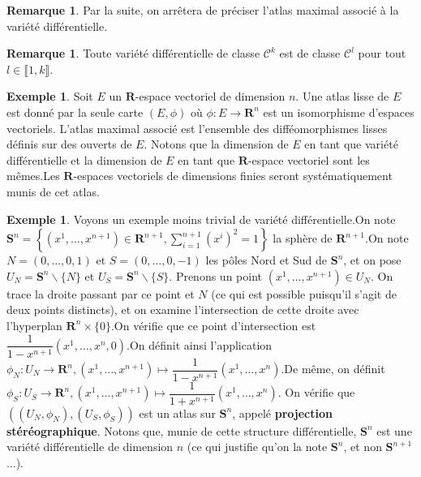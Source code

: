 \documentclass[12pt,a4paper]{article}
\theoremstyle{definition}
\newtheorem{ex}[thm]{Exemple}
\newtheorem{rqe}[thm]{Remarque}
\begin{document}
\begin{rqe}
Par la suite, on arrêtera de préciser l'atlas maximal associé à la variété différentielle.
\end{rqe}
\begin{rqe}
Toute variété différentielle de classe $\mathcal{C}^k$ est de classe $\mathcal{C}^{l}$ pour tout $l\in\llbracket 1,k\rrbracket$.
\end{rqe}
\begin{ex}
Soit $E$ un $\mathbf{R}$-espace vectoriel de dimension $n$. Une atlas lisse de $E$ est donné par la seule carte $(E,\phi)$ où $\phi:E\to\mathbf{R}^n$ est un isomorphisme d'espaces vectoriels. L'atlas maximal associé est l'ensemble des difféomorphismes lisses définis sur des ouverts de $E$. Notons que la dimension de $E$ en tant que variété différentielle et la dimension de $E$ en tant que $\mathbf{R}$-espace vectoriel sont les mêmes.\newline Les $\mathbf{R}$-espaces vectoriels de dimensions finies seront systématiquement munis de cet atlas.
\end{ex}
\begin{ex}
Voyons un exemple moins trivial de variété différentielle.\newline On note $\displaystyle\mathbf{S}^n=\left\lbrace(x^1,\ldots,x^{n+1})\in\mathbf{R}^{n+1},\sum\limits_{i=1}^{n+1}(x^i)^2=1\right\rbrace$ la sphère de $\mathbf{R}^{n+1}$.\newline On note $N=(0,\ldots, 0,1)$ et $S=(0,\ldots, 0,-1)$ les pôles Nord et Sud de $\mathbf{S}^n$, et on pose $U_N=\mathbf{S}^n\backslash \{N\}$ et $U_S=\mathbf{S}^n\backslash\{S\}$. Prenons un point $(x^1,\ldots,x^{n+1})\in U_N$. On trace la droite passant par ce point et $N$ (ce qui est possible puisqu'il s'agit de deux points distincts), et on examine l'intersection de cette droite avec l'hyperplan $\mathbf{R}^n\times\{0\}$.\newline On vérifie que ce point d'intersection est $\dfrac{1}{1-x^{n+1}}(x^1,\ldots,x^n,0)$.\newline On définit ainsi l'application $\phi_N: U_N\to\mathbf{R}^n, (x^1,\ldots,x^{n+1})\mapsto\dfrac{1}{1-x^{n+1}}(x^1,\ldots,x^n)$.\newline De même, on définit $\phi_S: U_S\to\mathbf{R}^n, (x^1,\ldots,x^{n+1})\mapsto\dfrac{1}{1+x^{n+1}}(x^1,\ldots,x^n)$. On vérifie que $((U_N,\phi_N),(U_S,\phi_S))$ est un atlas sur $\mathbf{S}^n$, appelé \textbf{projection stéréographique}.\newline
Notons que, munie de cette structure différentielle, $\mathbf{S}^n$ est une variété différentielle de dimension $n$ (ce qui justifie qu'on la note $\mathbf{S}^n$, et non $\mathbf{S}^{n+1}$...).
\end{ex}
\end{document}

